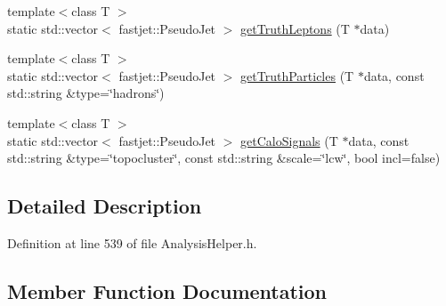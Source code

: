 \begin{DoxyCompactItemize}
\item 
{\footnotesize template$<$class T $>$ }\\static std\+::vector$<$ fastjet\+::\+Pseudo\+Jet $>$ \hyperlink{structAnalysisHelper_1_1PseudoJetGetter_aa9b43a97e3ae2ad6d458e8298df3674c}{get\+Truth\+Leptons} (T $\ast$data)
\item 
{\footnotesize template$<$class T $>$ }\\static std\+::vector$<$ fastjet\+::\+Pseudo\+Jet $>$ \hyperlink{structAnalysisHelper_1_1PseudoJetGetter_a3c45d4409f3bfcb9d34304953dabecd6}{get\+Truth\+Particles} (T $\ast$data, const std\+::string \&type=\char`\"{}hadrons\char`\"{})
\item 
{\footnotesize template$<$class T $>$ }\\static std\+::vector$<$ fastjet\+::\+Pseudo\+Jet $>$ \hyperlink{structAnalysisHelper_1_1PseudoJetGetter_a75a3d9fe6a12ff0775c6bdd8a99d03e7}{get\+Calo\+Signals} (T $\ast$data, const std\+::string \&type=\char`\"{}topocluster\char`\"{}, const std\+::string \&scale=\char`\"{}lcw\char`\"{}, bool incl=false)
\end{DoxyCompactItemize}


\subsection{Detailed Description}


Definition at line 539 of file Analysis\+Helper.\+h.



\subsection{Member Function Documentation}
